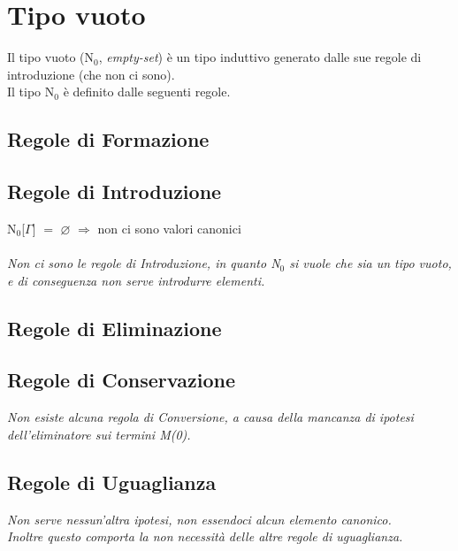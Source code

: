 \chapter{Tipo vuoto}
\label{cap: N0}
Il tipo vuoto (N$_0$, \textit{empty-set}) \`e un tipo induttivo generato dalle sue regole di introduzione (che non ci sono). \\ Il tipo N$_0$ \`e definito dalle seguenti regole.

\section{Regole di Formazione}
\label{sec: formazione-N0}
\begin{prooftree}
\end{prooftree}

\section{Regole di Introduzione}
\label{sec: introduzione-N0}
N$_0$[$\Gamma$] $=$ $\varnothing$ $\Rightarrow$ non ci sono valori canonici\\\\
\noindent
\textit{Non ci sono le regole di Introduzione, in quanto N$_0$ si vuole che sia un tipo vuoto, e di conseguenza non serve introdurre elementi.}

\section{Regole di Eliminazione}
\label{sec: eliminazione-N0}
\begin{prooftree}
\end{prooftree}

\section{Regole di Conservazione}
\label{sec: conservazione-funzione}
\textit{Non esiste alcuna regola di Conversione, a causa della mancanza di ipotesi dell'eliminatore sui termini M(0).}

\section{Regole di Uguaglianza}
\label{sec: uguaglianza-funzione}
\begin{prooftree}
\end{prooftree}
\noindent
\textit{Non serve nessun'altra ipotesi, non essendoci alcun elemento canonico.\\ Inoltre questo comporta la non necessit\`a delle altre regole di uguaglianza.}


